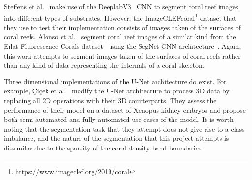 Steffens et al.~\cite{steff} make use of the DeeplabV3~\cite{deeplab} CNN to segment coral reef images into different types of substrates. However, the ImageCLEFcoral\footnote{\url{https://www.imageclef.org/2019/coral}} dataset that they use to test their implementation consists of images taken of the surfaces of coral reefs. Alonso et al.~\cite{alonso} segment coral reef images of a similar kind from the Eilat Fluorescence Corals dataset~\cite{eilat} using the SegNet CNN architecture~\cite{segnet}. Again, this work attempts to segment images taken of the surfaces of coral reefs rather than any kind of data representing the internals of a coral skeleton.

Three dimensional implementations of the U-Net architecture do exist. For example, {\c{C}}i{\c{c}}ek et al.~\cite{cicek} modify the U-Net architecture to process 3D data by replacing all 2D operations with their 3D counterparts. They assess the performance of their model on a dataset of Xenopus kidney embryos and propose both semi-automated and fully-automated use cases of the model. It is worth noting that the segmentation task that they attempt does not give rise to a class imbalance, and the nature of the segmentation that this project attempts is dissimilar due to the sparsity of the coral density band boundaries.



 
